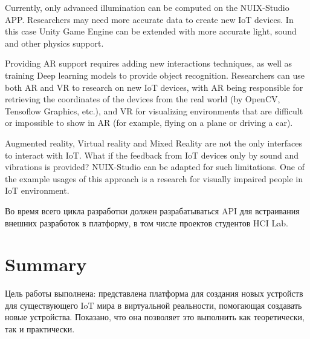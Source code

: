 Currently, only advanced illumination can be computed on the NUIX-Studio APP. Researchers may need more accurate data to create new IoT devices. In this case Unity Game Engine can be extended with more accurate light, sound and other physics support.

Providing AR support requires adding new interactions techniques, as well as training Deep learning models to provide object recognition. Researchers can use both AR and VR to research on new IoT devices, with AR being responsible for retrieving the coordinates of the devices from the real world (by OpenCV, Tensoflow Graphics, etc.), and VR for visualizing environments that are difficult or impossible to show in AR (for example, flying on a plane or driving a car).

Augmented reality, Virtual reality and Mixed Reality are not the only interfaces to interact with IoT. What if the feedback from IoT devices only by sound and vibrations is provided? NUIX-Studio can be adapted for such limitations. One of the example usages of this approach is a research for visually impaired people in IoT environment.

Во время всего цикла разработки должен разрабатываться API для встраивания внешних разработок в платформу, в том числе проектов студентов HCI Lab.

\section{Summary}

Цель работы выполнена: представлена платформа для создания новых устройств для существующего IoT мира в виртуальной реальности, помогающая создавать новые устройства. Показано, что она позволяет это выполнить как теоретически, так и практически.
